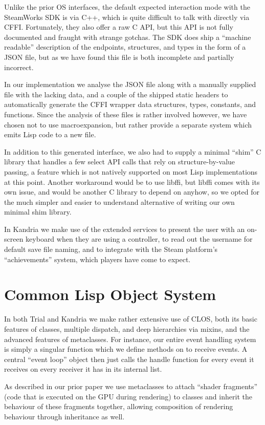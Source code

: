 \documentclass[format=sigconf]{acmart}
\begin{document}
Unlike the prior OS interfaces, the default expected interaction mode with the SteamWorks SDK is via C++, which is quite difficult to talk with directly via CFFI. Fortunately, they also offer a raw C API, but this API is not fully documented and fraught with strange gotchas. The SDK does ship a ``machine readable'' description of the endpoints, structures, and types in the form of a JSON file, but as we have found this file is both incomplete and partially incorrect.

In our implementation we analyse the JSON file along with a manually supplied file with the lacking data, and a couple of the shipped static headers to automatically generate the CFFI wrapper data structures, types, constants, and functions. Since the analysis of these files is rather involved however, we have chosen not to use macroexpansion, but rather provide a separate system which emits Lisp code to a new file.

In addition to this generated interface, we also had to supply a minimal ``shim'' C library that handles a few select API calls that rely on structure-by-value passing, a feature which is not natively supported on most Lisp implementations at this point. Another workaround would be to use libffi, but libffi comes with its own issue, and would be another C library to depend on anyhow, so we opted for the much simpler and easier to understand alternative of writing our own minimal shim library.

In Kandria we make use of the extended services to present the user with an on-screen keyboard when they are using a controller, to read out the username for default save file naming, and to integrate with the Steam platform's ``achievements'' system, which players have come to expect.

\section{Common Lisp Object System}\label{clos}
In both Trial and Kandria we make rather extensive use of CLOS, both its basic features of classes, multiple dispatch, and deep hierarchies via mixins, and the advanced features of metaclasses. For instance, our entire event handling system is simply a singular function  which we define methods on to receive events. A central ``event loop'' object then just calls the handle function for every event it receives on every receiver it has in its internal list.

As described in our prior paper \cite{hafner2018} we use metaclasses to attach ``shader fragments'' (code that is executed on the GPU during rendering) to classes and inherit the behaviour of these fragments together, allowing composition of rendering behaviour through inheritance as well.
\end{document}

